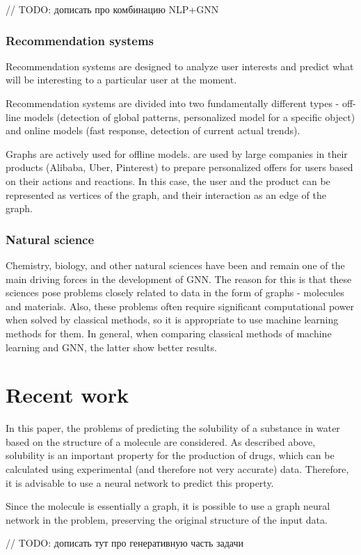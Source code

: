 \documentclass[a4paper,14pt]{article}
\begin{document}
// TODO: дописать про комбинацию NLP+GNN

\subsubsection*{Recommendation systems}
Recommendation systems are designed to analyze user interests and predict what will be interesting to a particular user at the moment.

Recommendation systems are divided into two fundamentally different types - off-line models (detection of global patterns, personalized model for a specific object) and online models (fast response, detection of current actual trends). 

Graphs are actively used for offline models. are used by large companies in their products (Alibaba, Uber, Pinterest) to prepare personalized offers for users based on their actions and reactions. In this case, the user and the product can be represented as vertices of the graph, and their interaction as an edge of the graph.

\subsubsection*{Natural science}

Chemistry, biology, and other natural sciences have been and remain one of the main driving forces in the development of GNN. The reason for this is that these sciences pose problems closely related to data in the form of graphs - molecules and materials. Also, these problems often require significant computational power when solved by classical methods, so it is appropriate to use machine learning methods for them. In general, when comparing classical methods of machine learning and GNN, the latter show better results.

\section{Recent work}
In this paper, the problems of predicting the solubility of a substance in water based on the structure of a molecule are considered. As described above, solubility is an important property for the production of drugs, which can be calculated using experimental (and therefore not very accurate) data. Therefore, it is advisable to use a neural network to predict this property.

Since the molecule is essentially a graph, it is possible to use a graph neural network in the problem, preserving the original structure of the input data.

// TODO: дописать тут про генеративную часть задачи
\end{document}
